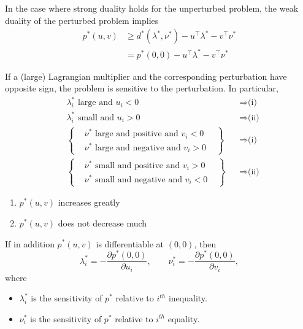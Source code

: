 \newpar{}

In the case where strong duality holds for the unperturbed problem, the weak duality of the perturbed problem implies
\begin{align*}
    p^*(u,v) & \geq d^*(\lambda^*,\nu^*) - u^\top \lambda^* -v^\top\nu^* \\
             & = p^*(0,0) - u^\top \lambda^* -v^\top\nu^*
\end{align*}

\newpar{}

If a (large) Lagrangian multiplier and the corresponding perturbation have opposite sign, the problem is sensitive to the perturbation. In particular,
\begin{align*}
     & \lambda_i^* \text{ large and } u_i < 0              &  & \Rightarrow \text{(i)}  \\
     & \lambda_i^* \text{ small and } u_i > 0              &  & \Rightarrow \text{(ii)} \\
     & \begin{Bmatrix}
            & \nu^* \text{ large and positive and } v_i < 0 \\
            & \nu^* \text{ large and negative and } v_i > 0
            &\end{Bmatrix} &  & \Rightarrow \text{(i)}                                 \\
     & \begin{Bmatrix}
            & \nu^* \text{ small and positive and } v_i > 0 \\
            & \nu^* \text{ small and negative and } v_i < 0
            &\end{Bmatrix} &  & \Rightarrow \text{(ii)}
\end{align*}
\begin{enumerate}[label=(\roman*), wide=0pt]
    \item $p^*(u,v)$ increases greatly
    \item $p^*(u,v)$ does not decrease much
\end{enumerate}

\newpar{}

If in addition $p^*(u,v)$ is differentiable at $(0,0)$, then
\begin{equation*}
    \lambda_i^* = -\frac{\partial p^*(0,0)}{\partial u_i}, \qquad  \nu_i^* = -\frac{\partial p^*(0,0)}{\partial v_i},
\end{equation*}
where
\begin{itemize}
    \item $\lambda_i^*$ is the sensitivity of $p^*$ relative to $i^{th}$ inequality.
    \item $\nu_i^*$ is the sensitivity of $p^*$ relative to $i^{th}$ equality.
\end{itemize}